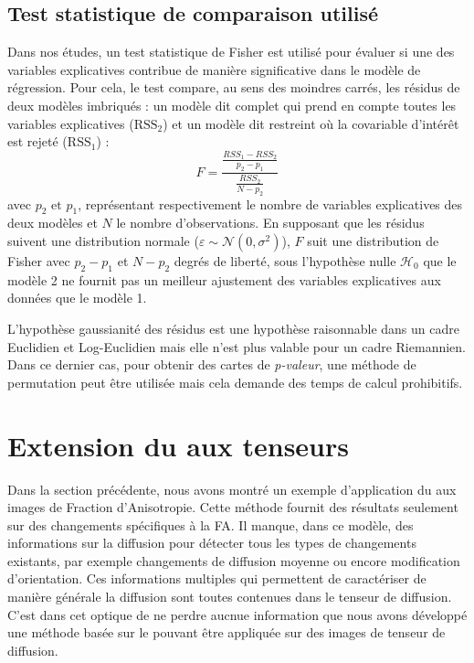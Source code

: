 \subsection{Test statistique de comparaison utilisé}
Dans nos études, un test statistique de Fisher est utilisé pour évaluer si une des variables explicatives contribue de manière significative dans le modèle de régression.
Pour cela, le test compare, au sens des moindres carrés, les résidus de deux modèles imbriqués : 
un modèle dit \og complet \fg qui prend en compte toutes les variables explicatives ($\mbox{RSS}_{2}$)
et un modèle dit \og restreint \fg où la covariable d'intérêt est rejeté ($\mbox{RSS}_{1}$) :
\begin{equation}
    F = \frac{\displaystyle \frac{RSS_{1} - RSS_{2}}{\displaystyle p_{2} - p_{1}} }{\displaystyle \frac{RSS_{2}}{ \displaystyle N - p_{2}}}
    \label{test_stat}
\end{equation}
avec $ p_{2} \mbox { et } p_{1}$, représentant respectivement le nombre de variables explicatives des deux modèles et $N$ le nombre d'observations.
En supposant que les résidus suivent une distribution normale ($\varepsilon \sim \mathcal{N}(0, \sigma^2)$), 
$F$ suit une distribution de Fisher avec $p_{2}-p_{1}$ et $ N-p_{2} $ degrés de liberté,
sous l'hypothèse nulle $\mathcal{H}_{0}$ que le modèle 2 ne fournit pas un meilleur ajustement des variables explicatives aux données que le modèle 1.

L'hypothèse gaussianité des résidus est une hypothèse raisonnable dans un cadre Euclidien et Log-Euclidien mais elle n'est plus valable pour un cadre Riemannien.
Dans ce dernier cas, pour obtenir des cartes de \textit{p-valeur}, une méthode de permutation peut être utilisée mais cela demande des temps de calcul prohibitifs.


\section{Extension du \mlg aux tenseurs}
Dans la section précédente, nous avons montré un exemple d'application du \mlg aux images de Fraction d'Anisotropie.
Cette méthode fournit des résultats seulement sur des changements spécifiques à la FA.
Il manque, dans ce modèle, des informations sur la diffusion pour détecter tous les types de changements existants,
par exemple changements de diffusion moyenne ou encore modification d'orientation.
Ces informations multiples qui permettent de caractériser de manière générale la diffusion sont toutes contenues dans le tenseur de diffusion.
C'est dans cet optique de ne perdre aucnue information que nous avons développé une méthode basée sur le \mlg 
pouvant être appliquée sur des images de tenseur de diffusion.

